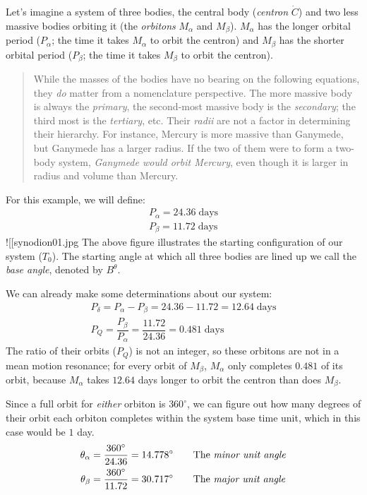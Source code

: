 \documentclass[
  letterpaper,
]{book}
\begin{document}
Let's imagine a system of three bodies, the central body (\emph{centron}
\(\dot{C}\)) and two less massive bodies orbiting it (the
\emph{orbitons} \(M_\alpha\) and \(M_\beta\)). \(M_\alpha\) has the
longer orbital period (\(P_\alpha\); the time it takes \(M_\alpha\) to
orbit the centron) and \(M_\beta\) has the shorter orbital period
(\(P_\beta\); the time it takes \(M_\beta\) to orbit the centron).

\begin{quote}
While the masses of the bodies have no bearing on the following
equations, they \emph{do} matter from a nomenclature perspective. The
more massive body is always the \emph{primary}, the second-most massive
body is the \emph{secondary}; the third most is the \emph{tertiary},
etc. Their \emph{radii} are not a factor in determining their hierarchy.
For instance, Mercury is more massive than Ganymede, but Ganymede has a
larger radius. If the two of them were to form a two-body system,
\emph{Ganymede would orbit Mercury}, even though it is larger in radius
and volume than Mercury.
\end{quote}

For this example, we will define: \[
\begin{align}
P_\alpha = 24.36\; \text{days} \\
P_\beta = 11.72\; \text{days}
\end{align}
\] !{[}{[}synodion01.jpg\textbar300{]}{]} The above figure illustrates
the starting configuration of our system (\(T_0\)). The starting angle
at which all three bodies are lined up we call the \emph{base angle},
denoted by \(B^\theta\).

We can already make some determinations about our system: \[
\begin{align}
P_\delta = P_\alpha - P_\beta = 24.36 - 11.72 = 12.64\; \text{days} \\
P_Q = \dfrac{P_\beta}{P_\alpha} = \dfrac{11.72}{24.36} = 0.481\; \text{days}
\end{align}
\] The ratio of their orbits (\(P_Q\)) is not an integer, so these
orbitons are not in a mean motion resonance; for every orbit of
\(M_\beta\), \(M_\alpha\) only completes \(0.481\) of its orbit, because
\(M_\alpha\) takes \(12.64\) days longer to orbit the centron than does
\(M_\beta\).

Since a full orbit for \emph{either} orbiton is \(360^\circ\), we can
figure out how many degrees of their orbit each orbiton completes within
the system base time unit, which in this case would be \(1\) day. \[
\begin{align}
\theta_\alpha &= \dfrac{360^\circ}{24.36} = 14.778^\circ \qquad \text{The \emph{minor unit angle}}\\
\theta_\beta &= \dfrac{360^\circ}{11.72} = 30.717^\circ  \qquad \text{The \emph{major unit angle}}\\
\end{align}
\]
\end{document}
